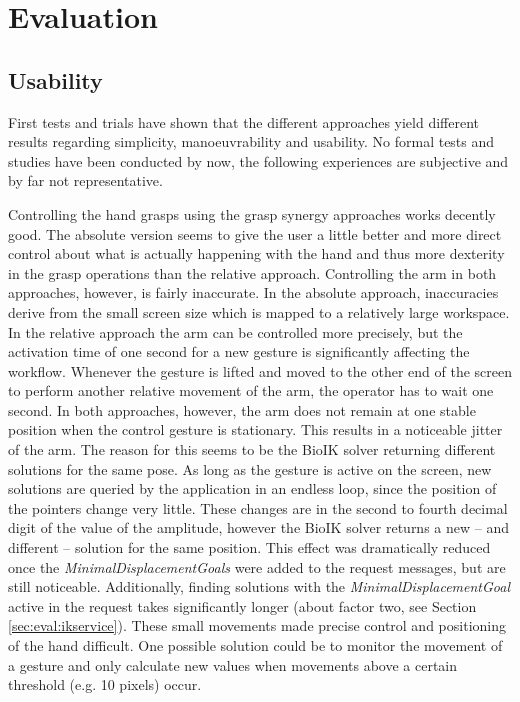 \chapter{Evaluation}
\label{chap:eval}

\section{Usability}

First tests and trials have shown that the different approaches yield different results regarding simplicity, manoeuvrability and usability. No formal tests and studies have been conducted by now, the following experiences are subjective and by far not representative.

Controlling the hand grasps using the grasp synergy approaches works decently good. The absolute version seems to give the user a little better and more direct control about what is actually happening with the hand and thus more dexterity in the grasp operations than the relative approach. Controlling the arm in both approaches, however, is fairly inaccurate. 
In the absolute approach, inaccuracies derive from the small screen size which is mapped to a relatively large workspace. In the relative approach the arm can be controlled more precisely, but the activation time of one second for a new gesture is significantly affecting the workflow. Whenever the gesture is lifted and moved to the other end of the screen to perform another relative movement of the arm, the operator has to wait one second.
In both approaches, however, the arm does not remain at one stable position when the control gesture is stationary. This results in a noticeable jitter of the arm. The reason for this seems to be the BioIK solver returning different solutions for the same pose. As long as the gesture is active on the screen, new solutions are queried by the application in an endless loop, since the position of the pointers change very little. These changes are in the second to fourth decimal digit of the value of the amplitude, however the BioIK solver returns a new -- and different -- solution for the same position. This effect was dramatically reduced once the \textit{MinimalDisplacementGoals} were added to the request messages, but are still noticeable. Additionally, finding solutions with the \textit{MinimalDisplacementGoal} active in the request takes significantly longer (about factor two, see Section \ref{sec:eval:ikservice}).  These small movements made precise control and positioning of the hand difficult. One possible solution could be to monitor the movement of a gesture and only calculate new values when movements above a certain threshold (e.g. 10 pixels) occur.

